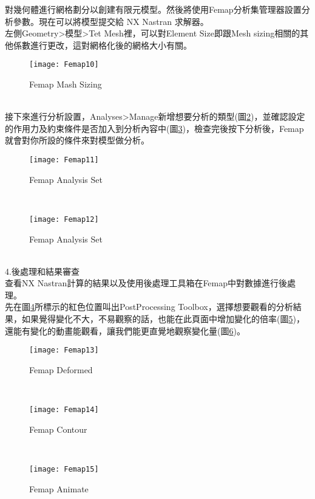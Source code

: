 \begin{itemize}
\qquad 對幾何體進行網格劃分以創建有限元模型。然後將使用Femap分析集管理器設置分析參數。現在可以將模型提交給 NX Nastran 求解器。\\

\qquad 左側Geometry>模型>Tet Mesh裡，可以對Element Size即跟Mesh sizing相關的其他係數進行更改，這對網格化後的網格大小有關。\\
\begin{figure}[hbt!]
\begin{center}
\texttt{[image: Femap10]}
\caption{\Large Femap Mash Sizing}\label{3.10}
\end{center}
\end{figure}
\\

\qquad 接下來進行分析設置，Analyses>Manage新增想要分析的類型(圖\ref{3.11})，並確認設定的作用力及約束條件是否加入到分析內容中(圖\ref{3.12})，檢查完後按下分析後，Femap就會對你所設的條件來對模型做分析。\\
\begin{figure}[hbt!]
\begin{center}
\texttt{[image: Femap11]}
\caption{\Large Femap Analysis Set}\label{3.11}
\end{center}
\end{figure}
\\
\begin{figure}[hbt!]
\begin{center}
\texttt{[image: Femap12]}
\caption{\Large Femap Analysis Set}\label{3.12}
\end{center}
\end{figure}
\\
4.後處理和結果審查\\

\qquad 查看NX Nastran計算的結果以及使用後處理工具箱在Femap中對數據進行後處理。\\

\qquad 先在圖\ref{3.13}所標示的紅色位置叫出PostProcessing Toolbox，選擇想要觀看的分析結果，如果覺得變化不大，不易觀察的話，也能在此頁面中增加變化的倍率(圖\ref{3.14})，還能有變化的動畫能觀看，讓我們能更直覺地觀察變化量(圖\ref{3.15})。\\
\begin{figure}[hbt!]
\begin{center}
\texttt{[image: Femap13]}
\caption{\Large Femap Deformed}\label{3.13}
\end{center}
\end{figure}
\\
\begin{figure}[hbt!]
\begin{center}
\texttt{[image: Femap14]}
\caption{\Large Femap Contour}\label{3.14}
\end{center}
\end{figure}
\\
\begin{figure}[hbt!]
\begin{center}
\texttt{[image: Femap15]}
\caption{\Large Femap Animate}\label{3.15}
\end{center}
\end{figure}
\\
\end{itemize}

